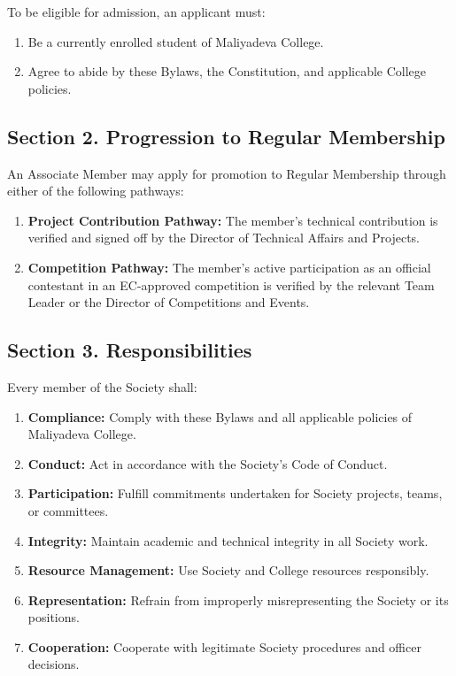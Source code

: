 \documentclass[a4paper]{article}
\begin{document}
To be eligible for admission, an applicant must:
\begin{enumerate}
  \item Be a currently enrolled student of Maliyadeva College.
  \item Agree to abide by these Bylaws, the Constitution, and applicable College policies.
\end{enumerate}

\subsection*{Section 2. Progression to Regular Membership}
An Associate Member may apply for promotion to Regular Membership through either of the following pathways:
\begin{enumerate}
  \item \textbf{Project Contribution Pathway:} The member's technical contribution is verified and signed off by the Director of Technical Affairs and Projects.
  \item \textbf{Competition Pathway:} The member's active participation as an official contestant in an EC-approved competition is verified by the relevant Team Leader or the Director of Competitions and Events.
\end{enumerate}

\subsection*{Section 3. Responsibilities}

Every member of the Society shall:
\begin{enumerate}
  \item \textbf{Compliance:} Comply with these Bylaws and all applicable policies of Maliyadeva College.
  \item \textbf{Conduct:} Act in accordance with the Society's Code of Conduct.
  \item \textbf{Participation:} Fulfill commitments undertaken for Society projects, teams, or committees.
  \item \textbf{Integrity:} Maintain academic and technical integrity in all Society work.
  \item \textbf{Resource Management:} Use Society and College resources responsibly.
  \item \textbf{Representation:} Refrain from improperly misrepresenting the Society or its positions.
  \item \textbf{Cooperation:} Cooperate with legitimate Society procedures and officer decisions.
\end{enumerate}
\end{document}
